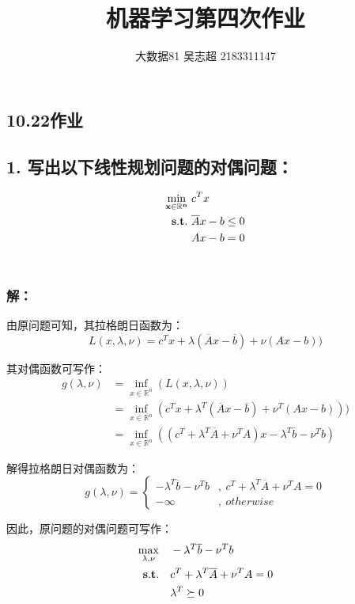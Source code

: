 \documentclass[12pt,a4paper]{article}
\title{机器学习第四次作业}
\author{大数据81 吴志超 2183311147}
\begin{document}
\begin{spacing}{1.3}
\section*{10.22作业}
\subsection*{1. 写出以下线性规划问题的对偶问题：}
\begin{equation}
    \begin{split}
        \bf{\min_{x\in \mathbb{R}^{n}}} \ & c^{T}x \\
        \bf{s.t.} \ &\overline{A}x-b \le 0 \\
        &Ax-b=0 \nonumber
    \end{split}
\end{equation}
\\
\subsubsection*{解：}
\par 由原问题可知，其拉格朗日函数为：
$$L(x,\lambda,\nu) = c^{T}x+\lambda(\overline{A}x-\overline{b})+\nu(Ax-b)) $$
\par 其对偶函数可写作：
\begin{equation}
    \begin{split}
        g(\lambda,\nu) 
        &= \inf_{x\in \mathbb{R}^{n}}(L(x,\lambda,\nu)) \\
        &= \inf_{x\in \mathbb{R}^{n}}(c^{T}x+\lambda^{T}(\overline{A}x-\overline{b})+\nu^{T}(Ax-b))) \\
        &= \inf_{x\in \mathbb{R}^{n}}((c^{T}+\lambda^{T}\overline{A} +\nu^{T}A)x - \lambda^{T}\overline{b}-\nu^{T}b)  \nonumber
    \end{split}
\end{equation}
\par 解得拉格朗日对偶函数为：
    \[ g(\lambda,\nu) = \left\{\begin{array}{ll}
        -\lambda^{T}\overline{b}-\nu^{T}b  &, \ c^{T}+\lambda^{T}\overline{A}+\nu^{T}A = 0 \\
        - \infty &,\ otherwise
    \end{array}\right.\]
\par 因此，原问题的对偶问题可写作：
\begin{equation}
    \begin{split}
        \bf{\max_{\lambda,\nu}} &\quad -\lambda^{T}\overline{b}-\nu^{T}b \\
        \bf{s.t.} &\quad c^{T}+\lambda^{T}\overline{A}+\nu^{T}A = 0 \\
        &\quad  \lambda^{T} \succeq 0 \nonumber
    \end{split}
\end{equation}


\end{spacing}
\end{document}
